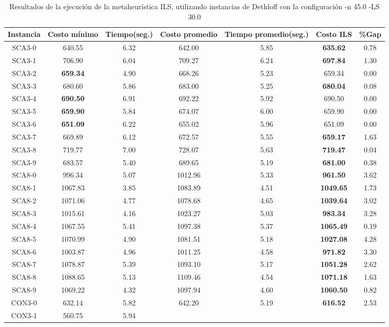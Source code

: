\begin{table}[ht]
\caption{Resultados de la ejecución de la metaheurística ILS, utilizando instancias de Dethloff con la configuración -n 45.0 -LS 30.0}
\centering
\small
\begin{tabular}{c c c c c c c}
\hline\hline
Instancia & Costo mínimo & Tiempo(seg.) & Costo promedio & Tiempo promedio(seg.) & Costo ILS & \%Gap \\ [0.5ex]
\hline
SCA3-0 & 640.55 & 6.32 & 
642.00 & 5.85 & \bf{635.62} & 
0.78\\SCA3-1 & 706.90 & 6.04 & 
709.27 & 6.24 & \bf{697.84} & 
1.30\\SCA3-2 & \bf{659.34} & 4.90 & 
668.26 & 5.23 & 659.34 & 0.00\\
SCA3-3 & 680.60 & 5.86 & 
683.00 & 5.25 & \bf{680.04} & 
0.08\\SCA3-4 & \bf{690.50} & 6.91 & 
692.22 & 5.92 & 690.50 & 0.00\\
SCA3-5 & \bf{659.90} & 5.84 & 
674.07 & 6.00 & 659.90 & 0.00\\
SCA3-6 & \bf{651.09} & 6.22 & 
655.02 & 5.96 & 651.09 & 0.00\\
SCA3-7 & 669.89 & 6.12 & 
672.57 & 5.55 & \bf{659.17} & 
1.63\\SCA3-8 & 719.77 & 7.00 & 
728.07 & 5.63 & \bf{719.47} & 
0.04\\SCA3-9 & 683.57 & 5.40 & 
689.65 & 5.19 & \bf{681.00} & 
0.38\\SCA8-0 & 996.34 & 5.07 & 
1012.96 & 5.33 & \bf{961.50} & 
3.62\\SCA8-1 & 1067.83 & 3.85 & 
1083.89 & 4.51 & \bf{1049.65} & 
1.73\\SCA8-2 & 1071.06 & 4.77 & 
1078.68 & 4.65 & \bf{1039.64} & 
3.02\\SCA8-3 & 1015.61 & 4.16 & 
1023.27 & 5.03 & \bf{983.34} & 
3.28\\SCA8-4 & 1067.55 & 5.41 & 
1097.38 & 5.37 & \bf{1065.49} & 
0.19\\SCA8-5 & 1070.99 & 4.90 & 
1081.51 & 5.18 & \bf{1027.08} & 
4.28\\SCA8-6 & 1003.87 & 4.96 & 
1011.25 & 4.58 & \bf{971.82} & 
3.30\\SCA8-7 & 1078.87 & 5.39 & 
1093.10 & 5.17 & \bf{1051.28} & 
2.62\\SCA8-8 & 1088.65 & 5.13 & 
1109.46 & 4.54 & \bf{1071.18} & 
1.63\\SCA8-9 & 1069.22 & 4.32 & 
1097.94 & 4.60 & \bf{1060.50} & 
0.82\\CON3-0 & 632.14 & 5.82 & 
642.20 & 5.19 & \bf{616.52} & 
2.53\\CON3-1 & 560.75 & 5.94 & 

\end{tabular}
\end{table}
